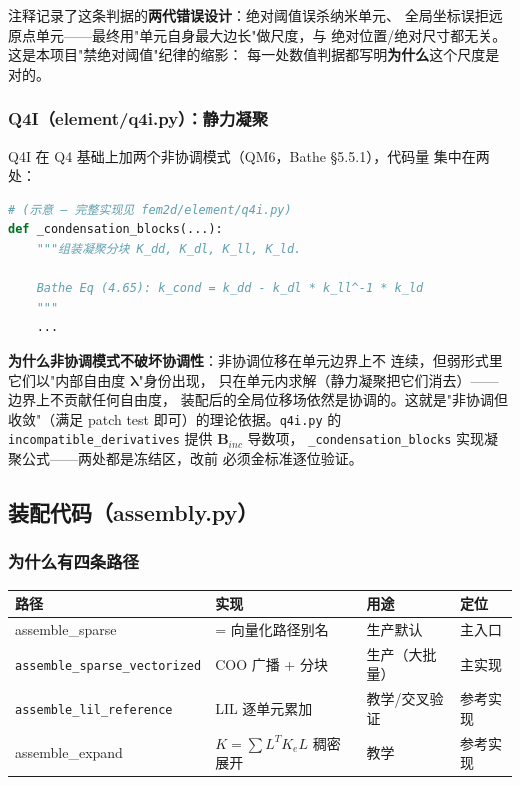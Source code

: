 \documentclass[12pt,a4paper]{ctexart}
\newcommand{\fem}{\Verb}
\begin{document}
注释记录了这条判据的\textbf{两代错误设计}：绝对阈值误杀纳米单元、
全局坐标误拒远原点单元——最终用"单元自身最大边长"做尺度，与
绝对位置/绝对尺寸都无关。这是本项目"禁绝对阈值"纪律的缩影：
每一处数值判据都写明\textbf{为什么}这个尺度是对的。

\subsubsection{Q4I（element/q4i.py）：静力凝聚}

Q4I 在 Q4 基础上加两个非协调模式（QM6，Bathe §5.5.1），代码量
集中在两处：

\begin{lstlisting}[language=python]
# (示意 — 完整实现见 fem2d/element/q4i.py)
def _condensation_blocks(...):
    """组装凝聚分块 K_dd, K_dl, K_ll, K_ld.

    Bathe Eq (4.65): k_cond = k_dd - k_dl * k_ll^-1 * k_ld
    """
    ...
\end{lstlisting}

\textbf{为什么非协调模式不破坏协调性}：非协调位移在单元边界上不
连续，但弱形式里它们以"内部自由度 $\boldsymbol{\lambda}$"身份出现，
只在单元内求解（静力凝聚把它们消去）——边界上不贡献任何自由度，
装配后的全局位移场依然是协调的。这就是"非协调但收敛"（满足
patch test 即可）的理论依据。\fem|q4i.py| 的
\fem|incompatible_derivatives| 提供 $\mathbf{B}_{inc}$ 导数项，
\fem|_condensation_blocks| 实现凝聚公式——两处都是冻结区，改前
必须金标准逐位验证。

\subsection{装配代码（assembly.py）}

\subsubsection{为什么有四条路径}

\begin{table}[h]
\centering
\small
\begin{tabular}{p{3.2cm}p{4.0cm}p{3.2cm}p{3.8cm}}
\toprule
\textbf{路径} & \textbf{实现} & \textbf{用途} & \textbf{定位} \\
\midrule
assemble\_sparse & = 向量化路径别名 & 生产默认 & 主入口 \\
\texttt{assemble\_sparse\_\newline vectorized} & COO 广播 + 分块 & 生产（大批量） & 主实现 \\
\texttt{assemble\_lil\_\newline reference} & LIL 逐单元累加 & 教学/交叉验证 & 参考实现 \\
assemble\_expand & $K = \sum L^T K_e L$ 稠密展开 & 教学 & 参考实现 \\
\bottomrule
\end{tabular}
\end{table}
\end{document}
